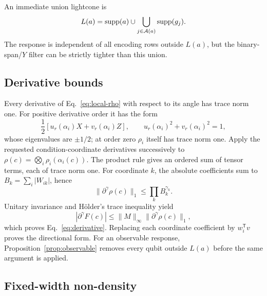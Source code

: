 An immediate union lightcone is
\begin{equation}
 L(a)=\operatorname{supp}(a)\cup
 \bigcup_{j\in\mathcal A(a)}\operatorname{supp}(g_j).
\end{equation}
The response is independent of all encoding rows outside $L(a)$, but the
binary-span/$Y$ filter can be strictly tighter than this union.

\subsection{Derivative bounds}

Every derivative of Eq.~\eqref{eq:local-rho} with respect to its angle has
trace norm one.  For positive derivative order it has the form
\begin{equation}
 \frac12[u_r(\alpha_i)X+v_r(\alpha_i)Z],\qquad
 u_r(\alpha_i)^2+v_r(\alpha_i)^2=1,
\end{equation}
whose eigenvalues are $\pm1/2$; at order zero $\rho_i$ itself has trace norm
one.  Apply the requested condition-coordinate derivatives successively to
$\rho(c)=\bigotimes_i\rho_i(\alpha_i(c))$.  The product rule gives an ordered
sum of tensor terms, each of trace norm one.  For coordinate $k$, the absolute
coefficients sum to $B_k=\sum_i|W_{ik}|$, hence
\begin{equation}
 \|\partial^\gamma\rho(c)\|_1
 \leq\prod_kB_k^{\gamma_k}.
\end{equation}
Unitary invariance and H\"older's trace inequality yield
\begin{equation}
 |\partial^\gamma F(c)|
 \leq\|M\|_\infty\|\partial^\gamma\rho(c)\|_1,
\end{equation}
which proves Eq.~\eqref{eq:derivative}.  Replacing each coordinate coefficient
by $w_i^\mathsf{T}v$ proves the directional form.  For an observable response,
Proposition~\ref{prop:observable} removes every qubit outside $L(a)$ before the
same argument is applied.

\subsection{Fixed-width non-density}


